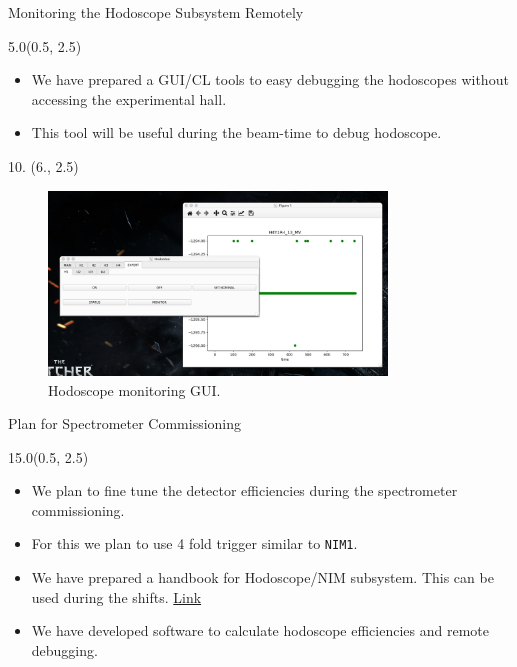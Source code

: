 \documentclass[12pt, xcolor={dvipsnames}, aspectratio = 169, sans,mathserif]{beamer}
\newenvironment{List}[2]
{
\begin{textblock}{#1}#2
\begin{itemize}
}
{
\end{itemize}
\end{textblock}
}
\newenvironment{Pic}[2]
{
\begin{textblock}{#1} #2
\begin{figure}
}
{
\end{figure}
\end{textblock}
}
\begin{document}
\begin{frame}[fragile]{Monitoring the Hodoscope Subsystem Remotely}
\begin{List}{5.0}{(0.5, 2.5)}

  \item We have prepared a GUI/CL tools to easy debugging the hodoscopes without accessing the experimental hall.

  \item This tool will be useful during the beam-time to debug hodoscope.

\end{List}

\begin{Pic}{10.}{(6., 2.5)}
  \includegraphics[width=9.0cm]{imgs/hodo_mon.png}
  \caption{Hodoscope monitoring GUI.}
\end{Pic}
\end{frame}

\begin{frame}[fragile]{Plan for Spectrometer Commissioning}
\begin{List}{15.0}{(0.5, 2.5)}

  \item We plan to fine tune the detector efficiencies during the spectrometer commissioning.

  \item For this we plan to use 4 fold trigger similar to \verb|NIM1|.

  \item We have prepared a handbook for Hodoscope/NIM subsystem. This can be used during the shifts. \href{https://github.com/dinupa1/NIM_Hodo_Handbook/blob/main/NIM_Hodo_Handbook.pdf}{Link}

  \item We have developed software to calculate hodoscope efficiencies and remote debugging.

\end{List}
\end{frame}
\end{document}
